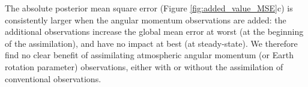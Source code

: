The absolute posterior mean square error (Figure \ref{fig:added_value_MSE}c) is consistently larger when the angular momentum observations are added: the additional observations increase the global mean error at worst (at the beginning of the assimilation), and have no impact at best (at steady-state). 
We therefore find no clear benefit of assimilating atmospheric angular momentum (or Earth rotation parameter) observations, either with or without the assimilation of conventional observations. 

